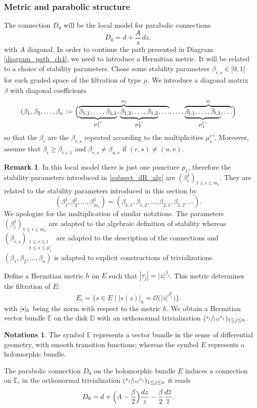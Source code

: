 \documentclass[JEP,XML,SOM,NoEqCountersInSection,Unicode,published]{cedram}
\newcommand{\sbullet}{{\scriptscriptstyle\bullet}}
\newcommand{\csbullet}{{\raisebox{1pt}{$\sbullet$}}}
\theoremstyle{definition}
\newtheorem{remark}[definition]{Remark}
\newtheorem{notations}[definition]{Notations}
\theoremstyle{plain}
\begin{document}
\subsubsection{Metric and parabolic structure}
The connection $D_0$ will be the local model for parabolic connections
\[
D_0 = d + \frac{A}{z}\, dz,
\]
with $A$ diagonal. In order to continue the path presented in Diagram \eqref{diagram_path_ch4}, we need to introduce a Hermitian metric. It will be related to a choice of stability parameters. Chose some stability parameters $\beta_{r,s}\in [0,1[$ for each graded space of the filtration of type $\underline{\mu}$. We introduce a diagonal matrix $\beta$ with diagonal coefficients
\[
(\beta_1,\beta_2,\dots,\beta_n := \Bigl(\overbrace{\underbrace{\beta_{1,1},\dots,\beta_{1,1}}_{{\mu^1_1}'},\underbrace{\beta_{1,2},\dots,\beta_{1,2}}_{{\mu^1_2}'},\dots}^{\nu_1},\dots,\overbrace{\underbrace{\beta_{l,1},\dots,\beta_{l,1}}_{{\mu^l_1}'},\dots }^{\nu_l} \Bigr)
\]
so that the $\beta_i$ are the $\beta_{r,s}$ repeated according to the multiplicities ${\mu^r_s}'$. Moreover, assume that $\beta_i \ge \beta_{i+1}$ and $\beta_{r,s}\ne \beta_{u,v}$ if $(r,s)\ne(u,v)$.
\begin{remark}\label{remark_various_beta}
In this local model there is just one puncture $p_1$, therefore the stability parameters introduced in \ref{subsect_dR_alg} are $(\beta^1_i)_{1\le i \le m_1}$. They are related to the stability parameters introduced in this section by
\[
(\beta^1_1,\beta^1_2,\dots,\beta^1_{m_1})=(\beta_{1,1},\beta_{1,2},\dots,\beta_{2,1},\beta_{2,2},\dots).
\]
We apologize for the multiplication of similar notations. The parameters $(\beta^1_i)_{1\le i \le m_1}$ are adapted to the algebraic definition of stability whereas $(\beta_{r,s})_{\substack{1\le r \le l \\ 1 \le s \le \mu^r_1 }}$ are adapted to the description of the connections and $(\beta_1,\beta_2,\dots,\beta_n)$ is adapted to explicit constructions of trivializations.
\end{remark}
Define a Hermitian metric $h$ on $E$ such that $|\tau_j| = |z|^{\beta_j}$. This metric determines the filtration of $E$:
\[
E_i = \bigl\lbrace s\in E \mid | s(z) |_h = \mathcal{O}\bigl(| z|^{\beta^1_i}\bigr)\bigr\rbrace.
\]
with $|\csbullet|_h$ being the norm with respect to the metric $h$. We obtain a Hermitian vector bundle $\mathbb{E}$ on the disk $\mathbb{D}$ with an orthonormal trivialization $(\sfrac{\tau_j}{|z|^{\beta_j}})_{1\le j \le n}$.
\begin{notations}
The symbol $\mathbb{E}$ represents a vector bundle in the sense of differential geometry, with smooth transition functions; whereas the symbol $E$ represents a holomorphic bundle.
\end{notations}
The parabolic connection $D_0$ on the holomorphic bundle $E$ induces a connection on $\mathbb{E}$, in the orthonormal trivialization $(\sfrac{\tau_j}{|z|^{\beta_j}})_{1\le j \le n}$ it reads
\[
D_0 = d + \Bigl(A -\frac{\beta}{2}\Bigr) \frac{d z}{z} -\frac{\beta}{2} \frac{d \overline{z}}{\overline{z}}.
\]
\end{document}
